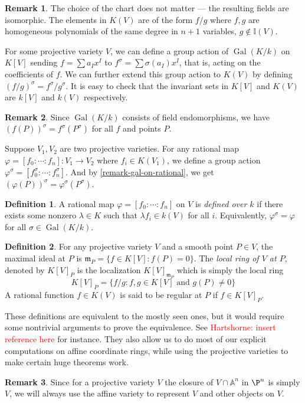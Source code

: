 \documentclass[12pt]{article}
\theoremstyle{remark}
\theoremstyle{definition}
\newtheorem{remark}{Remark}[subsection]
\newtheorem{definition}{Definition}[subsection]
\newcommand{\s}[0]{\sigma}
\newcommand{\A}[0]{\mathbb{A}}
\newcommand{\Gal}[0]{\operatorname{Gal}}
\begin{document}
        \begin{remark}
            The choice of the chart does not matter --- the resulting fields are isomorphic. The elements in $K(V)$ are of the form $f/g$ where $f, g$ are homogeneous polynomials of the same degree in $n+1$ variables, $g\notin\mathbb I(V)$.
        \end{remark}
        For some projective variety $V$, we can define a group action of $\Gal(K/k)$ on $K[V]$ sending $f=\sum a_{I}x^I$ to $f^\s=\sum \s(a_I)x^I$, that is, acting on the coefficients of $f$. We can further extend this group action to $K(V)$ by defining $(f/g)^\s=f^\s/g^\s$. It is easy to check that the invariant sets in $K[V]$ and $K(V)$ are $k[V]$ and $k(V)$ respectively.
        \begin{remark}\label{remark-gal-on-rational}
            Since $\Gal(K/k)$ consists of field endomorphisms, we have $(f(P))^\s=f^\s(P^\s)$ for all $f$ and points $P$.
        \end{remark}
        
        Suppose $V_1, V_2$ are two projective varieties. For any rational map $\varphi=[f_0:\cdots:f_n]:V_1\to V_2$ where $f_i\in K(V_1)$, we define a group action $\varphi^\s=[f_0^\s:\cdots:f_n^\s]$. And by \autoref{remark-gal-on-rational}, we get $(\varphi(P))^\s=\varphi^\s(P^\s)$.
        \begin{definition}
            A rational map $\varphi=[f_0:\cdots:f_n]$ on $V$ is \textit{defined over $k$} if there exists some nonzero $\lambda\in K$ such that $\lambda f_i\in k(V)$ for all $i$. Equivalently, $\varphi^\s=\varphi$ for all $\s\in\Gal(K/k)$.
        \end{definition}
        \begin{definition}
            For any projective variety $V$ and a smooth point $P\in V$, the maximal ideal at $P$ is $\mathfrak m_P=\{f\in K[V]:f(P)=0\}$. The \textit{local ring of $V$ at $P$}, denoted by $K[V]_P$ is the localization $K[V]_{\mathfrak m_P}$ which is simply the local ring
            \[K[V]_P=\{f/g:f, g\in K[V]\text{ and } g(P)\neq 0\}\]
            A rational function $f\in K(V)$ is said to be regular at $P$ if $f\in K[V]_P$.
        \end{definition}
        \noindent These definitions are equivalent to the mostly seen ones, but it would require some nontrivial arguments to prove the equivalence. See \textcolor{red}{Hartshorne: insert reference here} for instance. They also allow us to do most of our explicit computations on affine coordinate rings, while using the projective varieties to make certain huge theorems work.
        \begin{remark}
            Since for a projective variety $V$ the closure of $V\cap \A^n$ in $\P^n$ is simply $V$, we will always use the affine variety to represent $V$ and other objects on $V$.
        \end{remark}
\end{document}
